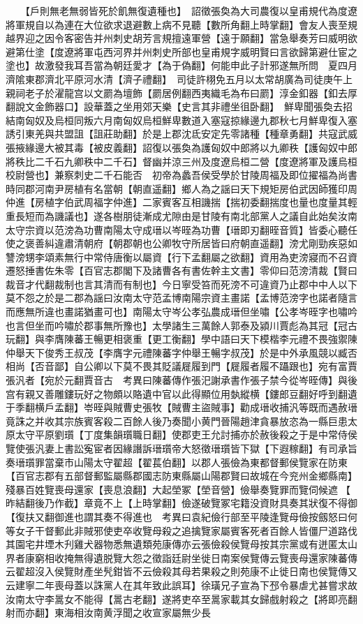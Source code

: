 　　【戶則無老無弱皆死於飢無復遺種也】　詔徵張奐為大司農復以皇甫規代為度遼將軍規自以為連在大位欲求退避數上病不見聽【數所角翻上時掌翻】會友人喪至規越界迎之因令客密告并州刺史胡芳言規擅遠軍營【遠于願翻】當急舉奏芳曰威明欲避第仕塗【度遼將軍屯西河界并州刺史所部也皇甫規字威明賢曰言欲歸第避仕宦之塗也】故激發我耳吾當為朝廷愛才【為于偽翻】何能申此子計邪遂無所問　夏四月濟隂東郡濟北平原河水清【濟子禮翻】　司徒許栩免五月以太常胡廣為司徒庚午上親祠老子於濯龍宫以文罽為壇飾【罽居例翻西夷織毛為布曰罽】淳金釦器【釦去厚翻說文金飾器口】設華蓋之坐用郊天樂【史言其非禮坐徂卧翻】　鮮卑聞張奐去招結南匈奴及烏桓同叛六月南匈奴烏桓鮮卑數道入塞寇掠緣邊九郡秋七月鮮卑復入塞誘引東羌與共盟詛【詛莊助翻】於是上郡沈氐安定先零諸種【種章勇翻】共寇武威張掖緣邊大被其毒【被皮義翻】詔復以張奐為護匈奴中郎將以九卿秩【護匈奴中郎將秩比二千石九卿秩中二千石】督幽并涼三州及度遼烏桓二營【度遼將軍及護烏桓校尉營也】兼察刺史二千石能否　初帝為蠡吾侯受學於甘陵周福及即位擢福為尚書時同郡河南尹房植有名當朝【朝直遥翻】鄉人為之謡曰天下規矩房伯武因師獲印周仲進【房植字伯武周福字仲進】二家賓客互相譏揣【揣初委翻揣度也量也度量其輕重長短而為譏議也】遂各樹朋徒漸成尤隙由是甘陵有南北部黨人之議自此始矣汝南太守宗資以范滂為功曹南陽太守成瑨以岑晊為功曹【瑨即刃翻晊音質】皆委心聽任使之褒善糾違肅清朝府【朝郡朝也公卿牧守所居皆曰府朝直遥翻】滂尤剛勁疾惡如讐滂甥李頌素無行中常侍唐衡以屬資【行下孟翻屬之欲翻】資用為吏滂寢而不召資遷怒捶書佐朱零【百官志郡閣下及諸曹各有書佐幹主文書】零仰曰范滂清裁【賢曰裁音才代翻裁制也言其清而有制也】今日寧受笞而死滂不可違資乃止郡中中人以下莫不怨之於是二郡為謡曰汝南太守范孟博南陽宗資主畫諾【孟博范滂字也諾者隨言而應無所違也畫諾猶畫可也】南陽太守岑公孝弘農成瑨但坐嘯【公孝岑晊字也嘯吟也言但坐而吟嘯於郡事無所豫也】太學諸生三萬餘人郭泰及潁川賈彪為其冠【冠古玩翻】與李膺陳蕃王暢更相褒重【更工衡翻】學中語曰天下模楷李元禮不畏強禦陳仲舉天下俊秀王叔茂【李膺字元禮陳蕃字仲舉王暢字叔茂】於是中外承風競以臧否相尚【否音鄙】自公卿以下莫不畏其貶議屣履到門【屣履者履不躡跟也】宛有富賈張汎者【宛於元翻賈音古　考異曰陳蕃傳作張汜謝承書作張子禁今從岑晊傳】與後宫有親又善雕鏤玩好之物頗以賂遺中官以此得顯位用埶縱横【鏤郎豆翻好呼到翻遺于季翻横戶孟翻】岺晊與賊曹史張牧【賊曹主盜賊事】勸成瑨收捕汎等既而遇赦瑨竟誅之并收其宗族賓客殺二百餘人後乃奏聞小黄門晉陽趙津貪暴放恣為一縣巨患太原太守平原劉瓆【丁度集韻瓆職日翻】使郡吏王允討捕亦於赦後殺之于是中常侍侯覽使張汎妻上書訟寃宦者因緣譖訴瑨瓆帝大怒徵瑨瓆皆下獄【下遐稼翻】有司承旨奏瑨瓆罪當棄市山陽太守翟超【翟萇伯翻】以郡人張儉為東都督郵侯覽家在防東【百官志郡有五部督郵監屬縣郡國志防東縣屬山陽郡賢曰故城在今兖州金鄉縣南】殘暴百姓覽喪母還家【喪息浪翻】大起塋冢【塋音營】儉舉奏覽罪而覽伺候遮【昨結翻後乃作截】章竟不上【上時掌翻】儉遂破覽冢宅籍没資財具奏其狀復不得御【復扶又翻御進也謂其奏不得進也　考異曰袁紀儉行部至平陵逢覽母儉按劔怒曰何等女子干督郵此非賊邪使吏卒收覽母殺之追擒覽家屬賓客死者百餘人皆僵尸道路伐其園宅井堙木刋雞犬器物悉無遺類苑康傳亦云張儉殺侯覽母按其宗黨或有迸匿太山界者康窮相收掩無得遺脱覽大怨之徵詣廷尉坐徙日南案侯覽傳云覽喪母還家陳蕃傳云翟超沒入侯覽財產坐髠鉗皆不云儉殺其母若果殺之則苑康不止徙日南也侯覽傳又云建寧二年喪母蓋以誅黨人在其年致此誤耳】徐璜兄子宣為下邳令暴虐尤甚嘗求故汝南太守李暠女不能得【暠古老翻】遂將吏卒至暠家載其女歸戲射殺之【將即亮翻射而亦翻】東海相汝南黄浮聞之收宣家屬無少長